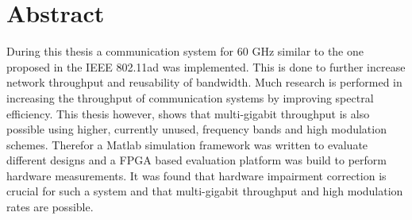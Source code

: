 \chapter*{Abstract}
During this thesis a communication system for 60 GHz similar to the one proposed
in the \gls{IEEE} 802.11ad was implemented.
This is done to further increase network throughput and reusability of bandwidth.
Much research is performed in increasing the throughput of communication systems
by improving spectral efficiency.
This thesis however, shows that multi-gigabit throughput is also possible using
higher, currently unused, frequency bands and high modulation schemes.
Therefor a Matlab simulation framework was written to evaluate different designs
and a \acrshort{FPGA} based evaluation platform was build to perform hardware
measurements.
It was found that hardware impairment correction is crucial for such a system
and that multi-gigabit throughput and high modulation
rates are possible.

